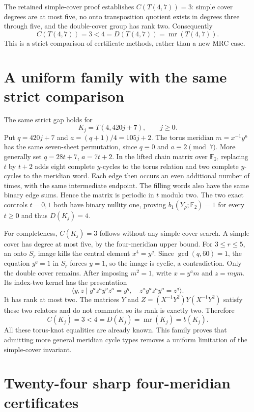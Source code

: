 \documentclass[11pt]{article}
\newcommand{\mr}{\operatorname{mr}}
\newcommand{\F}{\mathbb F}
\begin{document}
The retained simple-cover proof establishes $C(T(4,7))=3$: simple
cover degrees are at most five, no onto transposition quotient exists
in degrees three through five, and the double-cover group has rank
two. Consequently
\[
                    C(T(4,7))=3<4=D(T(4,7))=\mr(T(4,7)).
\]
This is a strict comparison of certificate methods, rather than a new
MRC case.

\section{A uniform family with the same strict comparison}

The same strict gap holds for
\[
                             K_j=T(4,420j+7),\qquad j\ge0.
\]
Put $q=420j+7$ and $a=(q+1)/4=105j+2$.
The torus meridian $m=x^{-1}y^a$ has the same seven-sheet permutation,
since $q\equiv0$ and $a\equiv2\pmod7$.
More generally set $q=28t+7$, $a=7t+2$. In the lifted chain matrix
over $\F_2$, replacing $t$ by $t+2$ adds eight complete $y$-cycles to
the torus relation and two complete $y$-cycles to the meridian word.
Each edge then occurs an even additional number of times, with the
same intermediate endpoint. The filling words also have the same
binary edge sums. Hence the matrix is periodic in $t$ modulo two.
The two exact controls $t=0,1$ both have binary nullity one, proving
$b_1(Y_\rho;\F_2)=1$ for every $t\ge0$ and thus $D(K_j)=4$.

For completeness, $C(K_j)=3$ follows without any simple-cover search.
A simple cover has degree at most five, by the four-meridian upper
bound. For $3\le r\le5$, an onto $S_r$ image kills the central element
$x^4=y^q$. Since $\gcd(q,60)=1$, the equation $y^q=1$ in $S_r$
forces $y=1$, so the image is cyclic, a contradiction.
Only the double cover remains. After imposing $m^2=1$, write
$x=y^a m$ and $z=mym$. Its index-two kernel has the presentation
\[
 \langle y,z\mid y^az^ay^az^a=y^q,\quad
                   z^ay^az^ay^a=z^q\rangle.
\]
It has rank at most two. The matrices $Y$ and
$Z=(X^{-1}Y^2)Y(X^{-1}Y^2)$ satisfy these two relators and do not
commute, so its rank is exactly two. Therefore
\[
                       C(K_j)=3<4=D(K_j)=\mr(K_j)=b(K_j).
\]
All these torus-knot equalities are already known. This family proves
that admitting more general meridian cycle types removes a uniform
limitation of the simple-cover invariant.

\section{Twenty-four sharp four-meridian certificates}
\end{document}
